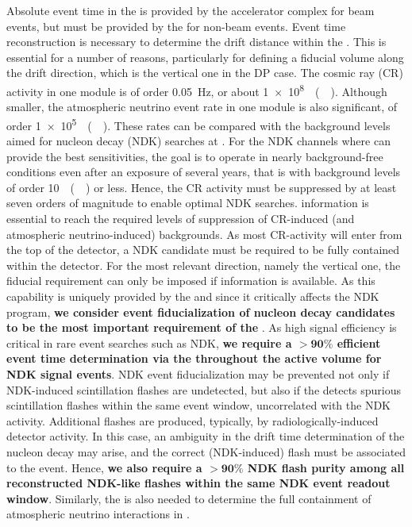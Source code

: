 Absolute event time in the \dune {} is provided by the accelerator complex for beam events, but must be provided by the  for non-beam events. Event time reconstruction is necessary to determine the drift distance within the . This is essential for a number of reasons, particularly for defining a fiducial volume along the  drift direction, which is the vertical one in the DP case. The cosmic ray (CR) activity in one  module is of order \SI{0.05}{\Hz}, or about \SI{1e8}{\per(\Mtyr)}. Although smaller, the atmospheric neutrino event rate in one  module is also significant, of order \SI{1e5}{\per(\Mtyr)}. These rates can be compared with the background levels aimed for nucleon decay (NDK) searches at \dune. For the NDK channels where \dune can provide the best sensitivities, the goal is to operate in nearly background-free conditions even after an exposure of several years, that is with background levels of order \SI{10}{\per(\Mtyr)} or less. Hence, the CR activity must be suppressed by at least seven orders of magnitude to enable optimal NDK searches.  information is essential to reach the required levels of suppression of CR-induced (and atmospheric neutrino-induced) backgrounds. As most CR-activity will enter from the top of the detector, a NDK candidate must be required to be fully contained within the detector. For the most relevant direction, namely the vertical one, the fiducial requirement can only be imposed if  information is available. As this capability is uniquely provided by the  and since it critically affects the NDK program, {\bf we consider event fiducialization of nucleon decay candidates to be the most important requirement of the }. As high signal efficiency is critical in rare event searches such as NDK, {\bf we require a $\boldsymbol{>90\%}$ efficient event time determination via the  throughout the  active volume for NDK signal events}. NDK event fiducialization may be prevented not only if NDK-induced  scintillation flashes are undetected, but also if the  detects spurious  scintillation flashes within the same event window, uncorrelated with the NDK activity. Additional flashes are produced, typically, by radiologically-induced detector activity. In this case, an ambiguity in the drift time determination of the nucleon decay may arise, and the correct (NDK-induced) flash must be associated to the event. Hence, {\bf we also require a $\boldsymbol{>90\%}$ NDK flash purity among all reconstructed NDK-like flashes within the same NDK event readout window}. Similarly, the  is also needed to determine the full containment of atmospheric neutrino interactions in \dune.
 
